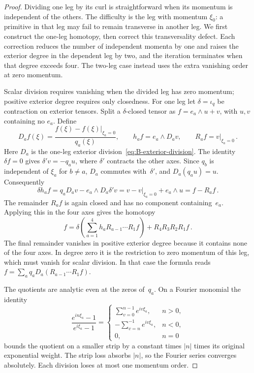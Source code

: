 \begin{proof}
Dividing one leg by its curl is straightforward when its momentum is independent of the others. The difficulty is the leg with momentum $\xi_0$: a primitive in that leg may fail to remain transverse in another leg. We first construct the one-leg homotopy, then correct this transversality defect. Each correction reduces the number of independent momenta by one and raises the exterior degree in the dependent leg by two, and the iteration terminates when that degree exceeds four. The two-leg case instead uses the extra vanishing order at zero momentum.

Scalar division requires vanishing when the divided leg has zero momentum; positive exterior degree requires only closedness. For one leg let $\delta=\iota_q$ be contraction on exterior tensors. Split a $\delta$-closed tensor as $f=e_a\wedge u+v$, with $u,v$ containing no $e_a$. Define
\begin{equation*}
D_af(\xi)=\frac{f(\xi)-f(\xi)|_{\xi_a=0}}{q_a(\xi)},
\qquad h_af=e_a\wedge D_av,
\qquad R_af=v|_{\xi_a=0}\,.
\end{equation*}
Here $D_a$ is the one-leg exterior division~\eqref{eq:B-exterior-division}. The identity $\delta f=0$ gives $\delta'v=-q_au$, where $\delta'$ contracts the other axes. Since $q_b$ is independent of $\xi_a$ for $b\ne a$, $D_a$ commutes with~$\delta'$, and $D_a(q_au)=u$. Consequently
\begin{equation*}
\delta h_af=q_aD_av-e_a\wedge D_a\delta'v
=v-v|_{\xi_a=0}+e_a\wedge u=f-R_af\,.
\end{equation*}
The remainder $R_af$ is again closed and has no component containing~$e_a$. Applying this in the four axes gives the homotopy
\begin{equation*}
f=\delta\left(\sum_{a=1}^4h_aR_{a-1}\cdots R_1f\right)+R_4R_3R_2R_1f\,.
\end{equation*}
The final remainder vanishes in positive exterior degree because it contains none of the four axes. In degree zero it is the restriction to zero momentum of this leg, which must vanish for scalar division. In that case the formula reads $f=\sum_aq_aD_a(R_{a-1}\cdots R_1f)$.

The quotients are analytic even at the zeros of~$q_a$. On a Fourier monomial the identity
\begin{equation*}
\frac{e^{in\xi_a}-1}{e^{i\xi_a}-1}=
\begin{cases}\sum_{v=0}^{n-1}e^{iv\xi_a},&n>0,\\
-\sum_{v=n}^{-1}e^{iv\xi_a},&n<0,\\0,&n=0\end{cases}
\end{equation*}
bounds the quotient on a smaller strip by a constant times $|n|$ times its original exponential weight. The strip loss absorbs $|n|$, so the Fourier series converges absolutely. Each division loses at most one momentum order.


\end{proof}
